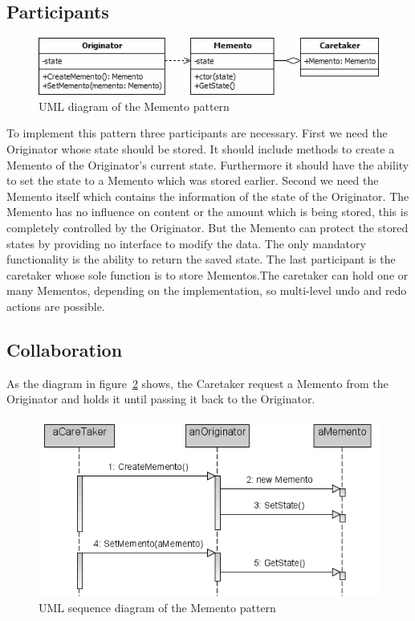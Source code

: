 \documentclass{bioinfo}
\begin{document}
\subsection{Participants}
\begin{figure}[ht]
    \centering
    \includegraphics[width=1\linewidth]{img/Memento.png}
    \caption{UML diagram of the Memento pattern \cite{mementoUML}}
    \label{fig:Memento_pattern}
\end{figure}
To implement this pattern three participants are necessary. First we need the Originator whose state should be stored. It should include methods to create a Memento of the Originator's current state. Furthermore it should have the ability to set the state to a Memento which was stored earlier.
Second we need the Memento itself which contains the information of the state of the Originator. The Memento has no influence on content or the amount which is being stored, this is completely controlled by the Originator. But the Memento can protect the stored states by providing no interface to modify the data. The only mandatory functionality is the ability to return the saved state.
The last participant is the caretaker whose sole function is to store Mementos.The caretaker can hold one or many Mementos, depending on the implementation, so multi-level undo and redo actions are possible. \cite{gang4}

\subsection{Collaboration}
As the diagram in figure~\ref{fig:Memento_pattern_sequence} shows, the Caretaker request a Memento from the Originator and holds it until passing it back to the Originator.
\begin{figure}[ht]
    \centering
    \includegraphics[width=1\linewidth]{img/Memento_design_pattern_sequence1.png}
    \caption{UML sequence diagram of the Memento pattern \cite{memento_seq}}
    \label{fig:Memento_pattern_sequence}
\end{figure}
\end{document}

